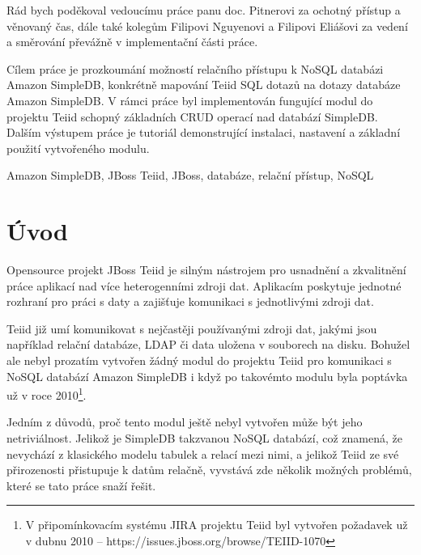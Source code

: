 \documentclass[oneside,12pt]{fithesis2}
\begin{document}
  
\VerbatimFootnotes
\FrontMatter  
\ThesisTitlePage  

\setcounter{page}{1} 

\begin{ThesisDeclaration}  
\DeclarationText  
\AdvisorName  
\end{ThesisDeclaration}   

\begin{ThesisThanks}  
Rád bych poděkoval vedoucímu práce panu doc. Pitnerovi za ochotný přístup a věnovaný čas, dále také kolegům Filipovi Nguyenovi a Filipovi Eliášovi za vedení a směrování převážně v implementační části práce.
\end{ThesisThanks}  
 
\begin{ThesisAbstract}  
Cílem práce je prozkoumání možností relačního přístupu k NoSQL databázi Amazon SimpleDB, konkrétně mapování Teiid SQL dotazů na dotazy databáze Amazon SimpleDB. V rámci práce byl implementován fungující modul do projektu Teiid schopný základních CRUD operací nad databází SimpleDB. Dalším výstupem práce je tutoriál demonstrující instalaci, nastavení a základní použití vytvořeného modulu.
\end{ThesisAbstract}  
 
\begin{ThesisKeyWords}  
Amazon SimpleDB, JBoss Teiid, JBoss, databáze, relační přístup, NoSQL
\end{ThesisKeyWords}  
 
\MainMatter

\tableofcontents   
\chapter{Úvod}
Opensource projekt JBoss Teiid je silným nástrojem pro usnadnění a zkvalitnění práce aplikací nad více heterogenními zdroji dat. Aplikacím poskytuje jednotné rozhraní pro práci s daty a zajišťuje komunikaci s jednotlivými zdroji dat. 

Teiid již umí komunikovat s nejčastěji používanými zdroji dat, jakými jsou například relační databáze, LDAP či data uložena v souborech na disku. Bohužel ale nebyl prozatím vytvořen žádný modul do projektu Teiid pro komunikaci s NoSQL databází Amazon SimpleDB i když po takovémto modulu byla poptávka už v roce 2010\footnote{V připomínkovacím systému JIRA projektu Teiid byl vytvořen požadavek už v dubnu 2010 -- https://issues.jboss.org/browse/TEIID-1070}. 

Jedním z důvodů, proč tento modul ještě nebyl vytvořen může být jeho netriviálnost. Jelikož je SimpleDB takzvanou NoSQL databází, což znamená, že nevychází z klasického modelu tabulek a relací mezi nimi, a jelikož Teiid ze své přirozenosti přistupuje k datům relačně, vyvstává zde několik možných problémů, které se tato práce snaží řešit.
\end{document}
